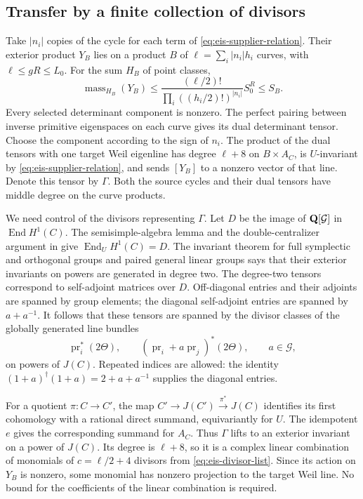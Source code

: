 \subsection{Transfer by a finite collection of divisors}

Take $|n_i|$ copies of the cycle for each term of
\eqref{eq:eis-supplier-relation}. Their exterior product $Y_B$ lies on
a product $B$ of $\ell=\sum_i|n_i|h_i$ curves, with
$\ell\le gR\le L_0$. For the sum $H_B$ of point classes,
\begin{equation}\label{eq:eis-product-mass}
 \operatorname{mass}_{H_B}(Y_B)
 \le \frac{(\ell/2)!}{\prod_i((h_i/2)!)^{|n_i|}}S_0^R
 \le S_B.
\end{equation}
Every selected determinant component is nonzero. The perfect pairing
between inverse primitive eigenspaces on each curve gives its dual
determinant tensor. Choose the component according to the sign of
$n_i$. The product of the dual tensors with one target Weil eigenline
has degree $\ell+8$ on $B\times A_C$, is $U$-invariant by
\eqref{eq:eis-supplier-relation}, and sends $[Y_B]$ to a nonzero vector
of that line. Denote this tensor by $\Gamma$. Both the source cycles
and their dual tensors have middle degree on the curve products.

We need control of the divisors representing $\Gamma$. Let
$D$ be the image of $\mathbf Q[\mathcal G]$ in $\operatorname{End}H^1(C)$.
The semisimple-algebra lemma and the double-centralizer argument in
\cite[Lemma~3.5]{MilneLefschetz} give
$\operatorname{End}_U H^1(C)=D$. The invariant theorem for full
symplectic and orthogonal groups and paired general linear groups
\cite[Proposition~3.6 and Remark~3.7]{MilneLefschetz} says that their
exterior invariants on powers are generated in degree two.
The degree-two tensors correspond to self-adjoint matrices over $D$.
Off-diagonal entries and their adjoints are spanned by group elements;
the diagonal self-adjoint entries are spanned by $a+a^{-1}$.
It follows that these tensors are spanned by the divisor classes of
the globally generated line bundles
\begin{equation}\label{eq:eis-divisor-list}
 \operatorname{pr}_i^*(2\Theta),\qquad
 (\operatorname{pr}_i+a\operatorname{pr}_j)^*(2\Theta),
 \qquad a\in\mathcal G,
\end{equation}
on powers of $J(C)$. Repeated indices are allowed: the identity
$(1+a)^\dagger(1+a)=2+a+a^{-1}$ supplies the diagonal entries.

For a quotient $\pi:C\to C'$, the map
$C'\to J(C')\xrightarrow{\pi^*}J(C)$ identifies its first cohomology
with a rational direct summand, equivariantly for $U$. The idempotent
$e$ gives the corresponding summand for $A_C$. Thus $\Gamma$ lifts
to an exterior invariant on a power of $J(C)$. Its degree is $\ell+8$,
so it is a complex linear combination of monomials of
$c=\ell/2+4$ divisors from \eqref{eq:eis-divisor-list}. Since its
action on $Y_B$ is nonzero, some monomial has nonzero projection to
the target Weil line. No bound for the coefficients of the linear
combination is required.

